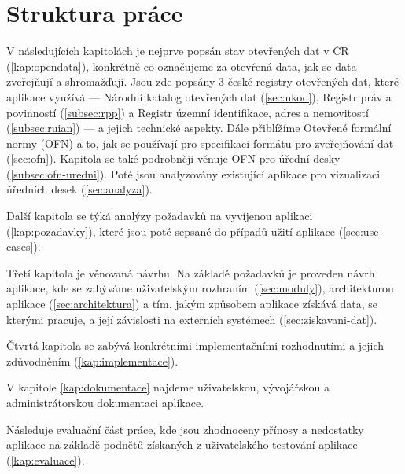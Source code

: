 \section*{Struktura práce}

V následujících kapitolách je nejprve popsán stav otevřených dat v ČR (\autoref{kap:opendata}), konkrétně co označujeme za otevřená data, jak se data zveřejňují a shromažďují. Jsou zde popsány 3 české registry otevřených dat, které aplikace využívá --- Národní katalog otevřených dat (\autoref{sec:nkod}), Registr práv a povinností (\autoref{subsec:rpp}) a Registr územní identifikace, adres a nemovitostí (\autoref{subsec:ruian}) --- a jejich technické aspekty. Dále přiblížíme Otevřené formální normy (OFN) a to, jak se používají pro specifikaci formátu pro zveřejňování dat (\autoref{sec:ofn}). Kapitola se také podrobněji věnuje OFN pro úřední desky (\autoref{subsec:ofn-uredni}). Poté jsou analyzovány existující aplikace pro vizualizaci úředních desek (\autoref{sec:analyza}).

Další kapitola se týká analýzy požadavků na vyvíjenou aplikaci (\autoref{kap:pozadavky}), které jsou poté sepsané do případů užití aplikace (\autoref{sec:use-cases}).

Třetí kapitola je věnovaná návrhu. Na základě požadavků je proveden návrh aplikace, kde se zabýváme uživatelským rozhraním (\autoref{sec:moduly}), architekturou aplikace (\autoref{sec:architektura}) a tím, jakým způsobem aplikace získává data, se kterými pracuje, a její závislosti na externích systémech (\autoref{sec:ziskavani-dat}).

Čtvrtá kapitola se zabývá konkrétními implementačními rozhodnutími a jejich zdůvodněním (\autoref{kap:implementace}).

V kapitole \ref{kap:dokumentace} najdeme uživatelskou, vývojářskou a administrátorskou dokumentaci aplikace.

Následuje evaluační část práce, kde jsou zhodnoceny přínosy a nedostatky aplikace na základě podnětů získaných z uživatelského testování aplikace (\autoref{kap:evaluace}).
